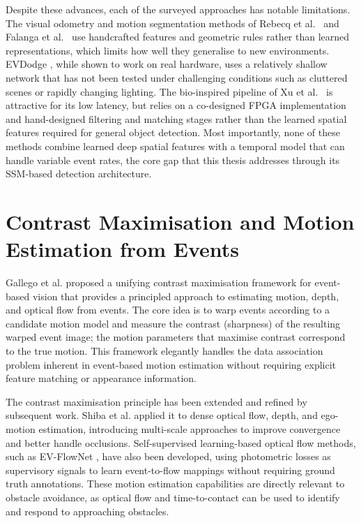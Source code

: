 \documentclass[11pt, a4paper]{report}
\begin{document}
Despite these advances, each of the surveyed approaches has notable limitations. The visual odometry and motion segmentation methods of Rebecq et al.\ \cite{rebecq2017real} and Falanga et al.\ \cite{falanga2020dynamic} use handcrafted features and geometric rules rather than learned representations, which limits how well they generalise to new environments. EVDodge \cite{sanket2020evdodgenet}, while shown to work on real hardware, uses a relatively shallow network that has not been tested under challenging conditions such as cluttered scenes or rapidly changing lighting. The bio-inspired pipeline of Xu et al.\ \cite{li2024taming} is attractive for its low latency, but relies on a co-designed FPGA implementation and hand-designed filtering and matching stages rather than the learned spatial features required for general object detection. Most importantly, none of these methods combine learned deep spatial features with a temporal model that can handle variable event rates, the core gap that this thesis addresses through its SSM-based detection architecture. 

\section{Contrast Maximisation and Motion Estimation from Events}
Gallego et al. \cite{gallego2018unifying} proposed a unifying contrast maximisation framework for event-based vision that provides a principled approach to estimating motion, depth, and optical flow from events. The core idea is to warp events according to a candidate motion model and measure the contrast (sharpness) of the resulting warped event image; the motion parameters that maximise contrast correspond to the true motion. This framework elegantly handles the data association problem inherent in event-based motion estimation without requiring explicit feature matching or appearance information. 

The contrast maximisation principle has been extended and refined by subsequent work. Shiba et al. \cite{shiba2024secrets} applied it to dense optical flow, depth, and ego-motion estimation, introducing multi-scale approaches to improve convergence and better handle occlusions. Self-supervised learning-based optical flow methods, such as EV-FlowNet \cite{zhu2018evflownet}, have also been developed, using photometric losses as supervisory signals to learn event-to-flow mappings without requiring ground truth annotations. These motion estimation capabilities are directly relevant to obstacle avoidance, as optical flow and time-to-contact can be used to identify and respond to approaching obstacles.
\end{document}
